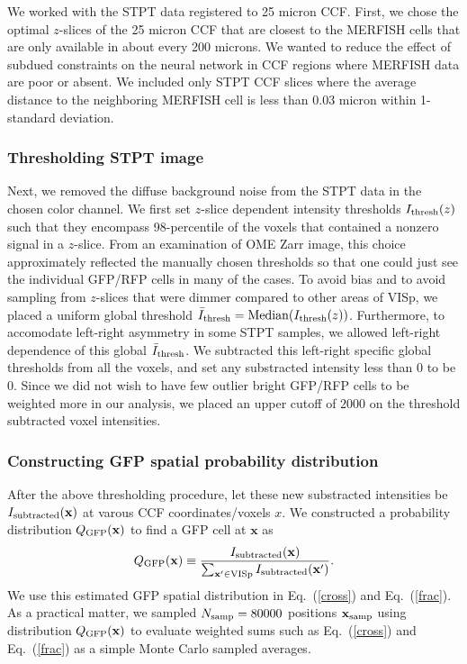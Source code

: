 \documentclass{article}
\newcommand\beq{\begin{equation}}
\newcommand\eeq[1]{\label{#1}\end{equation}}
\newcommand\eqn[1]{Eq.\ (\ref{#1})}
\begin{document}
We worked with the STPT data registered to 25 micron CCF.  First,
we chose the optimal $z$-slices of the 25 micron CCF that are closest
to the MERFISH cells that are only available in about every 200
microns.  We wanted to reduce the effect of subdued constraints on
the neural network in CCF regions where MERFISH data are poor or
absent. We included only STPT CCF slices where the average distance
to the neighboring MERFISH cell is less than 0.03 micron within
1-standard deviation.

\subsubsection{Thresholding STPT image}

Next, we removed the diffuse background noise from the STPT data
in the chosen color channel.  We first set $z$-slice dependent
intensity thresholds $I_{\rm thresh}(z)$ such that they encompass
98-percentile of the voxels that contained a nonzero signal in a
$z$-slice. From an examination of OME Zarr image, this choice
approximately reflected the manually chosen thresholds so that one
could just see the individual GFP/RFP cells in many of the cases.
To avoid bias and to avoid sampling from $z$-slices that were dimmer
compared to other areas of VISp, we placed a uniform global threshold
$\bar I_{\rm thresh} = {\rm Median}( I_{\rm thresh}(z) )$. 
Furthermore,
to accomodate left-right asymmetry in some STPT samples, we allowed 
left-right dependence of this global $\bar I_{\rm thresh}$. 
We subtracted this left-right specific global thresholds from all the voxels, 
and set any substracted intensity less than 0 to be 0.
Since
we did not wish to have few outlier bright GFP/RFP cells to 
be weighted more in our analysis, we placed an upper cutoff of 
$2000$ on the threshold subtracted voxel intensities. 

\subsubsection{Constructing GFP spatial probability distribution}
After the above
thresholding procedure, let these new substracted intensities be 
$I_{\rm subtracted}(\mathbf{x})$ at varous CCF coordinates/voxels $x$. We constructed a 
probability distribution $Q_{\rm GFP}(\mathbf{x})$ to find a GFP cell at $\mathbf{x}$ as 
\beq
Q_{\rm GFP}(\mathbf{x}) \equiv \frac{I_{\rm subtracted}(\mathbf{x})}{ \sum_{\mathbf{x'}\in \text{VISp}} I_{\rm subtracted}(\mathbf{x'}) }. 
\eeq{qxdef}
We use this estimated GFP spatial distribution in \eqn{cross} and
\eqn{frac}. As a practical matter, we sampled $N_{\rm samp} = 80000$ positions
$\mathbf{x}_{\rm samp}$ using distribution $Q_{\rm GFP}(\mathbf{x})$ to evaluate 
weighted sums such as \eqn{cross} and \eqn{frac} as a simple Monte Carlo sampled 
averages.
\end{document}
